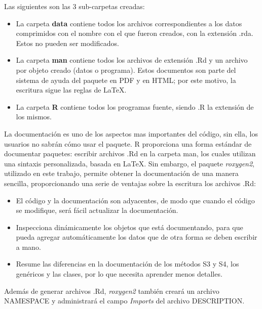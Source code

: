 Las siguientes son las 3 sub-carpetas creadas:

\begin{itemize}
\item La carpeta \textbf{data} contiene todos los archivos correspondientes a los datos comprimidos con el nombre con el que fueron creados, con la extensión .rda. Estos no pueden ser modificados.
\item La carpeta \textbf{man} contiene todos los archivos de extensión .Rd y un archivo por objeto creado (datos o programa). Estos documentos son parte del sistema de ayuda del paquete en PDF y en HTML; por este motivo, la escritura sigue las reglas de LaTeX.
\item La carpeta \textbf{R} contiene todos los programas fuente, siendo .R la extensión de los mismos.
\end{itemize}
La documentación es uno de los aspectos mas importantes del código, sin ella, los usuarios no sabrán cómo usar el paquete. R proporciona una forma estándar de documentar paquetes: escribir archivos .Rd en la carpeta man, los cuales utilizan una sintaxis personalizada, basada en LaTeX. Sin embargo, el paquete \emph{roxygen2}, utilizado en este trabajo, permite obtener la documentación de una manera sencilla, proporcionando una serie de ventajas sobre la escritura los archivos .Rd:

\begin{itemize}
\item El código y la documentación son adyacentes, de modo que cuando el código se modifique, será fácil actualizar la documentación.

\item Inspecciona dinámicamente los objetos que está documentando, para que pueda agregar automáticamente los datos que de otra forma se deben escribir a mano.

\item Resume las diferencias en la documentación de los métodos S3 y S4, los genéricos y las clases, por lo que necesita aprender menos detalles.
\end{itemize}

Además de generar archivos .Rd, \emph{roxygen2} también creará un archivo NAMESPACE y administrará el campo \emph{Imports} del archivo DESCRIPTION.


